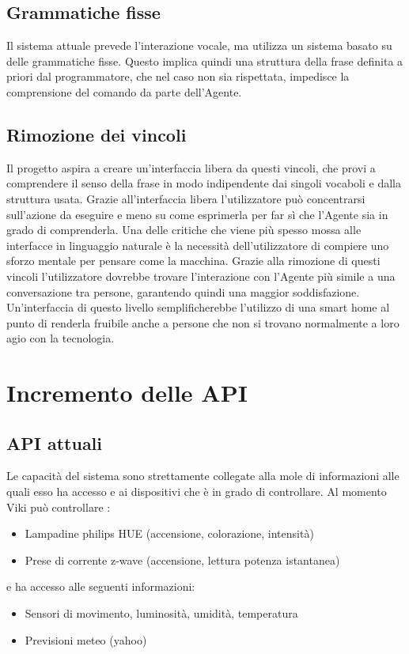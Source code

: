 \documentclass[twoside]{supsistudent}
\begin{document}
\subsection{Grammatiche fisse}
Il sistema attuale prevede l'interazione vocale, ma utilizza un sistema basato su delle grammatiche fisse. Questo implica quindi una struttura della frase definita a priori dal programmatore, che nel caso non sia rispettata, impedisce la comprensione del comando da parte dell'Agente.
\subsection{Rimozione dei vincoli}
Il progetto aspira a creare un'interfaccia libera da questi vincoli, che provi a comprendere il senso della frase in modo indipendente dai singoli vocaboli e dalla struttura usata.
Grazie all'interfaccia libera l'utilizzatore può concentrarsi sull'azione da eseguire e meno su come esprimerla per far sì che l'Agente sia in grado di comprenderla. Una delle critiche che viene più spesso mossa alle interfacce in linguaggio naturale è la necessità dell'utilizzatore di compiere uno sforzo mentale per pensare come la macchina.
Grazie alla rimozione di questi vincoli l'utilizzatore dovrebbe trovare l'interazione con l'Agente più simile a una conversazione tra persone, garantendo quindi una maggior soddisfazione.
Un'interfaccia di questo livello semplificherebbe l'utilizzo di una smart home al punto di renderla fruibile anche a persone che non si trovano normalmente a loro agio con la tecnologia.
\section{Incremento delle API}
\subsection{API attuali}
Le capacità del sistema sono strettamente collegate alla mole di informazioni alle quali esso ha accesso e ai dispositivi che è in grado di controllare. 
Al momento Viki può controllare :
\begin{itemize}
  \item Lampadine philips HUE (accensione, colorazione, intensità)
  \item Prese di corrente z-wave (accensione, lettura potenza istantanea)
\end{itemize}
e ha accesso alle seguenti informazioni:
\begin{itemize}
  \item Sensori di movimento, luminosità, umidità, temperatura
  \item Previsioni meteo (yahoo)
\end{itemize}
\end{document}
